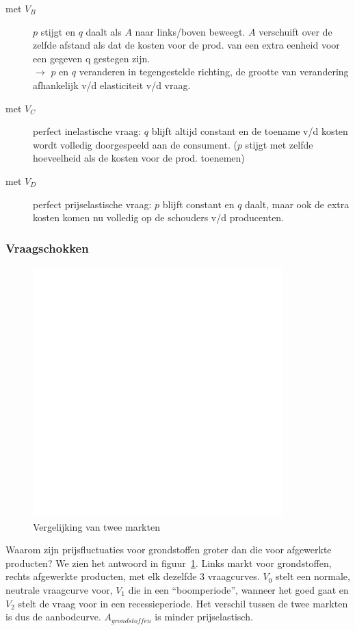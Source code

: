 \begin{description}
	\item[met $V_B$] $p$ stijgt en $q$ daalt als $A$ naar links/boven beweegt. $A$ verschuift over de zelfde afstand als dat de kosten voor de prod. van een extra eenheid voor een gegeven q gestegen zijn.\\
    $\rightarrow$ $p$ en $q$ veranderen in tegengestelde richting, de grootte van verandering afhankelijk v/d elasticiteit v/d vraag.
    \item[met $V_C$] perfect inelastische vraag: $q$ blijft altijd constant en de toename v/d kosten wordt volledig doorgespeeld aan de consument. ($p$ stijgt met zelfde hoeveelheid als de kosten voor de prod. toenemen)
    \item[met $V_D$] perfect prijselastische vraag: $p$ blijft constant en $q$ daalt, maar ook de extra kosten komen nu volledig op de schouders v/d producenten.
\end{description}

\subsubsection{Vraagschokken}
\begin{figure}[htbp]
	\centering
	\includegraphics[scale=0.4]{Images/white.png}
	\caption{Vergelijking van twee markten}
	\label{fig:vergelijkingTweeMarkten}
\end{figure}
Waarom zijn prijsfluctuaties voor grondstoffen groter dan die voor afgewerkte producten? We zien het antwoord in figuur~\ref{fig:vergelijkingTweeMarkten}. Links markt voor grondstoffen, rechts afgewerkte producten, met elk dezelfde 3 vraagcurves. $V_0$ stelt een normale, neutrale vraagcurve voor, $V_1$ die in een ``boomperiode'', wanneer het goed gaat en $V_2$ stelt de vraag voor in een recessieperiode. Het verschil tussen de twee markten is dus de aanbodcurve. $A_{grondstoffen}$ is minder prijselastisch.

